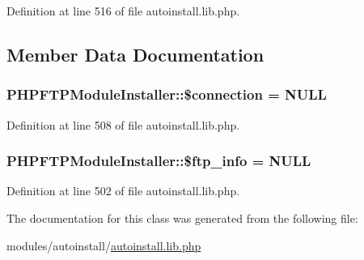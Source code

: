 Definition at line 516 of file autoinstall.\-lib.\-php.



\subsection{Member Data Documentation}
\hypertarget{classPHPFTPModuleInstaller_ab10c7e99865e2ba8ca058987dd81a986}{
\subsubsection[{\$connection}]{\setlength{\rightskip}{0pt plus 5cm}P\-H\-P\-F\-T\-P\-Module\-Installer\-::\$connection = N\-U\-L\-L}}\label{classPHPFTPModuleInstaller_ab10c7e99865e2ba8ca058987dd81a986}


Definition at line 508 of file autoinstall.\-lib.\-php.

\hypertarget{classPHPFTPModuleInstaller_abaa70235f6af643fc8d90fbecbc1892a}{
\subsubsection[{\$ftp\-\_\-info}]{\setlength{\rightskip}{0pt plus 5cm}P\-H\-P\-F\-T\-P\-Module\-Installer\-::\$ftp\-\_\-info = N\-U\-L\-L}}\label{classPHPFTPModuleInstaller_abaa70235f6af643fc8d90fbecbc1892a}


Definition at line 502 of file autoinstall.\-lib.\-php.



The documentation for this class was generated from the following file\-:\begin{DoxyCompactItemize}
\item 
modules/autoinstall/\hyperlink{autoinstall_8lib_8php}{autoinstall.\-lib.\-php}\end{DoxyCompactItemize}
